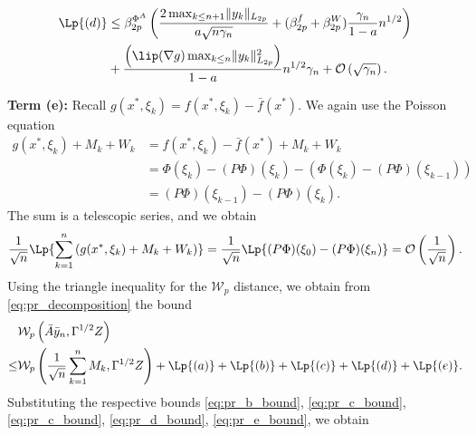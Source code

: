 \documentclass[11pt]{article}
\begin{document}
\begin{equation}\label{eq:pr_d_bound}
\begin{split}
    \Lp{(d)}
    &\leq 
    \beta_{2p}^{\Phi^A}
    \left(\frac{2 \max_{k \leq {n+1}} \lVert y_k \rVert_{L_{2p}} }{a \sqrt{n \gamma_n}} + (\beta_{2p}^f + \beta_{2p}^W) \frac{\gamma_n}{1-a} n^{1/2} \right)
    \\ 
    &+
    \frac{\left(\lip(\nabla g) \max_{k \leq n} \lVert y_k \rVert^2_{L_{2p}} \right)}{1-a} n^{1/2} \gamma_n
    + \mathcal{O}\left(\sqrt{\gamma_n}\right) .     
\end{split}
\end{equation}




\textbf{Term (e):}
Recall $g(x^*, \xi_k) = f(x^*, \xi_k) - \bar{f}(x^*)$. 
We again use the Poisson equation
\begin{align*}
    g(x^*, \xi_k) + M_k + W_k
    &=
    f(x^*, \xi_k) - \bar{f}(x^*) + M_k + W_k
    \\ &
    = \Phi(\xi_k) - (P \Phi)(\xi_k) - (\Phi(\xi_k) - (P\Phi)(\xi_{k-1}))
    \\ &
    = (P \Phi)(\xi_{k-1}) - (P\Phi)(\xi_k)  . 
\end{align*}
The sum is a telescopic series, and we obtain
\begin{equation}\label{eq:pr_e_bound}
    \frac{1}{\sqrt{n}} \Lp{\sum_{k=1}^n \left( g(x^*, \xi_k) + M_k + W_k\right) }
    =
    \frac{1}{\sqrt{n}} \Lp{(P\Phi)(\xi_0) - (P\Phi)(\xi_n)}
    = \mathcal{O}\left(\frac{1}{\sqrt{n}} \right) .     
\end{equation}
Using the triangle inequality for the $\mathcal{W}_p$ distance, we obtain from \eqref{eq:pr_decomposition} the bound
\begin{equation}
\begin{split}
    &\mathcal{W}_{p} \left( \bar{A} \bar{y}_n, \Gamma^{1/2}Z \right) 
    \\ 
    \leq
    &
    \mathcal{W}_{p} \left(\frac{1}{\sqrt{n}} \sum_{k=1}^n M_k, \Gamma^{1/2} Z \right)
    +
    \Lp{(a)} + \Lp{(b)}
    + \Lp{(c)}
    + \Lp{(d)}
    + \Lp{(e)} .     
\end{split}
\end{equation}
Substituting the respective bounds \eqref{eq:pr_b_bound}, \eqref{eq:pr_c_bound}, \eqref{eq:pr_c_bound}, \eqref{eq:pr_d_bound}, \eqref{eq:pr_e_bound}, we obtain 
\end{document}
